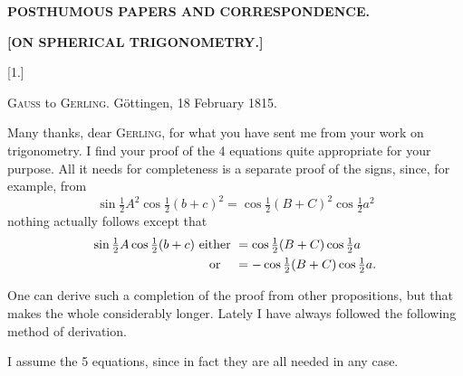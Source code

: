 \begin{center}
\textbf{POSTHUMOUS PAPERS AND CORRESPONDENCE.}

\vspace{1em}

\textbf{[ON SPHERICAL TRIGONOMETRY.]}

\vspace{0.5em}

\end{center}

\vspace{1em}

\begin{center}[1.]\end{center}

\begin{center}
\textsc{Gauss} to \textsc{Gerling}. Göttingen, 18 February 1815.
\end{center}

Many thanks, dear \textsc{Gerling}, for what you have sent me from
your work on trigonometry. I find your proof of the 4 equations
quite appropriate for your purpose. All it needs for
completeness is a separate proof of the signs,
since, for\,example, from
\[
\sin \tfrac12 A^2 \cos \tfrac12 (b+c)^2 = \cos \tfrac12 (B+C)^2 \cos \tfrac12 a^2
\]
nothing actually follows except that
\[
\begin{array}{r@{\ }c@{\ }l}
\sin \tfrac12 A \cos \tfrac12 (b+c) & \text{either} & {}=\cos \tfrac12 (B+C) \cos \tfrac12 a \\[4pt]
 & \text{or} & {}=-\cos \tfrac12 (B+C) \cos \tfrac12 a.
\end{array}
\]

One can derive such a completion of the proof from other propositions,
but that makes the whole considerably longer. Lately I have always followed
the following method of derivation.

I assume the 5 equations, since in fact they are all needed
in any case.

